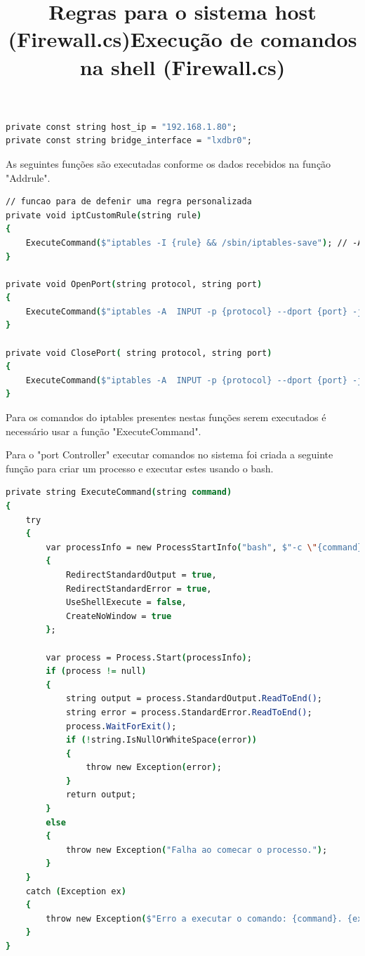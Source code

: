 \begin{lstlisting}[language=csh, caption={Constantes defenidas}]
private const string host_ip = "192.168.1.80";
private const string bridge_interface = "lxdbr0";
\end{lstlisting} 





\title*{\textbf{Regras para o sistema host (Firewall.cs)}}

As seguintes funções são executadas conforme os dados recebidos na função "Addrule".

\begin{lstlisting}[language=csh, caption={Função que executa comandos na shell}]
// funcao para de defenir uma regra personalizada 
private void iptCustomRule(string rule)
{
    ExecuteCommand($"iptables -I {rule} && /sbin/iptables-save"); // -A para adicionar no fundo da lista ou -I para adicionar ao topo da lista
}

private void OpenPort(string protocol, string port)
{
    ExecuteCommand($"iptables -A  INPUT -p {protocol} --dport {port} -j ACCEPT && /sbin/iptables-save");
}

private void ClosePort( string protocol, string port)
{
    ExecuteCommand($"iptables -A  INPUT -p {protocol} --dport {port} -j DROP && /sbin/iptables-save");
}
\end{lstlisting} 

Para os comandos do iptables presentes nestas funções serem executados é necessário
usar a função "ExecuteCommand".




\title*{\textbf{Execução de comandos na shell (Firewall.cs)}}


Para o "port Controller" executar comandos no sistema foi criada a seguinte função
para criar um processo e executar estes usando o bash. 

\begin{lstlisting}[language=csh, caption={Função que executa comandos na shell}]
private string ExecuteCommand(string command)
{
    try
    {
        var processInfo = new ProcessStartInfo("bash", $"-c \"{command}\"")
        {
            RedirectStandardOutput = true,
            RedirectStandardError = true,
            UseShellExecute = false,
            CreateNoWindow = true
        };

        var process = Process.Start(processInfo);
        if (process != null)
        {
            string output = process.StandardOutput.ReadToEnd();
            string error = process.StandardError.ReadToEnd();
            process.WaitForExit();
            if (!string.IsNullOrWhiteSpace(error))
            {
                throw new Exception(error);
            }
            return output;
        }
        else
        {
            throw new Exception("Falha ao comecar o processo.");
        }
    }
    catch (Exception ex)
    {
        throw new Exception($"Erro a executar o comando: {command}. {ex.Message}");
    }
}
\end{lstlisting} 





